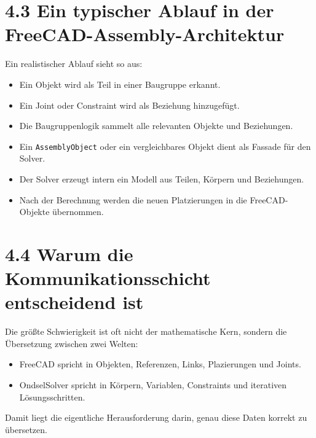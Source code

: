 \documentclass[
  12pt
]{book}
\providecommand{\tightlist}{%
  \setlength{\itemsep}{0pt}\setlength{\parskip}{0pt}}
\begin{document}
\hypertarget{ein-typischer-ablauf-in-der-freecad-assembly-architektur}{%
\section{\texorpdfstring{{4.3} Ein typischer Ablauf in der
FreeCAD-Assembly-Architektur}{4.3 Ein typischer Ablauf in der FreeCAD-Assembly-Architektur}}\label{ein-typischer-ablauf-in-der-freecad-assembly-architektur}}

Ein realistischer Ablauf sieht so aus:

\begin{itemize}
\tightlist
\item
  Ein Objekt wird als Teil in einer Baugruppe erkannt.
\item
  Ein Joint oder Constraint wird als Beziehung hinzugefügt.
\item
  Die Baugruppenlogik sammelt alle relevanten Objekte und Beziehungen.
\item
  Ein \texttt{AssemblyObject} oder ein vergleichbares Objekt dient als
  Fassade für den Solver.
\item
  Der Solver erzeugt intern ein Modell aus Teilen, Körpern und
  Beziehungen.
\item
  Nach der Berechnung werden die neuen Platzierungen in die
  FreeCAD-Objekte übernommen.
\end{itemize}

\hypertarget{warum-die-kommunikationsschicht-entscheidend-ist}{%
\section{\texorpdfstring{{4.4} Warum die Kommunikationsschicht
entscheidend
ist}{4.4 Warum die Kommunikationsschicht entscheidend ist}}\label{warum-die-kommunikationsschicht-entscheidend-ist}}

Die größte Schwierigkeit ist oft nicht der mathematische Kern, sondern
die Übersetzung zwischen zwei Welten:

\begin{itemize}
\tightlist
\item
  FreeCAD spricht in Objekten, Referenzen, Links, Plazierungen und
  Joints.
\item
  OndselSolver spricht in Körpern, Variablen, Constraints und iterativen
  Lösungsschritten.
\end{itemize}

Damit liegt die eigentliche Herausforderung darin, genau diese Daten
korrekt zu übersetzen.
\end{document}
